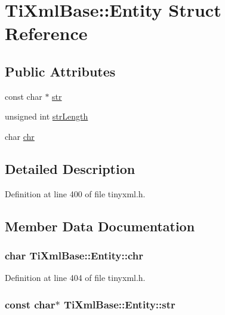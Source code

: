 \hypertarget{structTiXmlBase_1_1Entity}{
\section{TiXmlBase::Entity Struct Reference}
\label{d8/d33/structTiXmlBase_1_1Entity}
}
\subsection*{Public Attributes}
\begin{DoxyCompactItemize}
\item 
const char $\ast$ \hyperlink{structTiXmlBase_1_1Entity_ab721b5d4f7ed144ffd215947b38258b7}{str}
\item 
unsigned int \hyperlink{structTiXmlBase_1_1Entity_a22e8d820894d3360b01fed110badb876}{strLength}
\item 
char \hyperlink{structTiXmlBase_1_1Entity_a2a7e1e68b93b4f76255c60c8fa7f738e}{chr}
\end{DoxyCompactItemize}


\subsection{Detailed Description}


Definition at line 400 of file tinyxml.h.



\subsection{Member Data Documentation}
\hypertarget{structTiXmlBase_1_1Entity_a2a7e1e68b93b4f76255c60c8fa7f738e}{
\subsubsection[{chr}]{\setlength{\rightskip}{0pt plus 5cm}char {\bf TiXmlBase::Entity::chr}}}
\label{d8/d33/structTiXmlBase_1_1Entity_a2a7e1e68b93b4f76255c60c8fa7f738e}


Definition at line 404 of file tinyxml.h.

\hypertarget{structTiXmlBase_1_1Entity_ab721b5d4f7ed144ffd215947b38258b7}{
\subsubsection[{str}]{\setlength{\rightskip}{0pt plus 5cm}const char$\ast$ {\bf TiXmlBase::Entity::str}}}
\label{d8/d33/structTiXmlBase_1_1Entity_ab721b5d4f7ed144ffd215947b38258b7}


